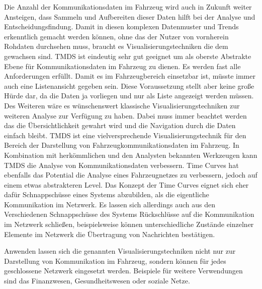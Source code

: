 \documentclass[draft=false
              ,paper=a4
              ,twoside=false
              ,fontsize=11pt
              ,headsepline
              ,BCOR10mm
              ,DIV11
              ]{scrbook}
\newcommand{\TODO}[1]{\colorbox{yellow}{\textcolor{red}{[TODO: #1]}}}
\begin{document}
Die Anzahl der Kommunikationsdaten im Fahrzeug wird auch in Zukunft weiter Ansteigen, dass Sammeln und Aufbereiten dieser Daten hilft bei der Analyse und Entscheidungsfindung. Damit in diesen komplexen Datenmuster und Trends erkenntlich gemacht werden können, ohne das der Nutzer von vornherein Rohdaten durchsehen muss, braucht es Visualisierungstechniken die dem gewachsen sind. TMDS ist eindeutig sehr gut geeignet um als oberste Abstrakte Ebene für Kommunikationsdaten im Fahrzeug zu dienen. Es werden fast alle Anforderungen erfüllt. Damit es im Fahrzeugbereich einsetzbar ist, müsste immer auch eine Listenansicht gegeben sein. Diese Voraussetzung stellt aber keine große Hürde dar, da die Daten ja vorliegen und nur als Liste angezeigt werden müssen. Des Weiteren wäre es wünschenswert klassische Visualisierungstechniken zur weiteren Analyse zur Verfügung zu haben. Dabei muss immer beachtet werden das die Übersichtlichkeit gewahrt wird und die Navigation durch die Daten einfach bleibt. TMDS ist eine vielversprechende Visualisierungstechnik für den Bereich der Darstellung von Fahrzeugkommunikationsdaten im Fahrzeug. In Kombination mit herkömmlichen und den Analysten bekannten Werkzeugen kann TMDS die Analyse von Kommunikationsdaten verbessern. Time Curves hat ebenfalls das Potential die Analyse eines Fahrzeugnetzes zu verbessern, jedoch auf einem etwas abstrakteren Level. Das Konzept der Time Curves eignet sich eher dafür Schnappschüsse eines Systems abzubilden, als die eigentliche Kommunikation im Netzwerk. Es lassen sich allerdings auch aus den Verschiedenen Schnappschüsse des Systems Rückschlüsse auf die Kommunikation im Netzwerk schließen, beispielsweise können unterschiedliche Zustände einzelner Elemente im Netzwerk die Übertragung von Nachrichten bestätigen.

Anwenden lassen sich die genannten Visualisierungstechniken nicht nur zur Darstellung von Kommunikation im Fahrzeug, sondern können für jedes geschlossene Netzwerk eingesetzt werden. Beispiele für weitere Verwendungen sind das Finanzwesen, Gesundheitswesen oder soziale Netze.

\end{document}
